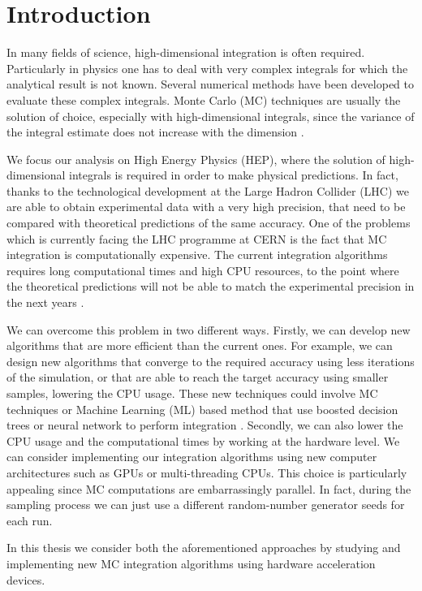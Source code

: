 \documentclass[../main/main.tex]{subfiles}
\begin{document}
\chapter*{Introduction}

In many fields of science, high-dimensional integration is often required. Particularly in physics one has to deal with very complex integrals for which the analytical result is not known. Several numerical methods have been developed to evaluate these complex integrals. Monte Carlo (MC) techniques are usually the solution of choice, especially with high-dimensional integrals, since the variance of the integral estimate does not increase with the dimension \cite{Press:1992zz}.

We focus our analysis on High Energy Physics (HEP), where the solution of high-dimensional integrals is required in order to make physical predictions. In fact, thanks to the technological development at the Large Hadron Collider (LHC) we are able to obtain experimental data with a very high precision, that need to be compared with theoretical predictions of the same accuracy. 
One of the problems which is currently facing the LHC programme at CERN \cite{Dainese:2703572} is the fact that MC integration is computationally expensive. The current integration algorithms requires long computational times  and high CPU resources, to the point where the theoretical predictions will not be able to match the experimental precision in the next years \cite{Buckley:2019wov}.

We can overcome this problem in two different ways. Firstly, we can develop new algorithms that are more efficient than the current ones. For example, we can design new algorithms that converge to the required accuracy using less iterations of the simulation, or that are able to reach the target accuracy using smaller samples, lowering the CPU usage. These new techniques could involve MC techniques or Machine Learning (ML) based method that use boosted decision trees or neural network to perform integration \cite{Bendavid:2017zhk}.
Secondly, we can also lower the CPU usage and the computational times  by working at the hardware level.
We can consider implementing our integration algorithms using new computer architectures such as GPUs or multi-threading CPUs. This choice is particularly appealing since MC computations are embarrassingly parallel. In fact, during the sampling process we can just use a different random-number generator seeds for each run.

In this thesis we consider both the aforementioned approaches by studying and implementing new MC integration algorithms using hardware acceleration devices.
\end{document}

